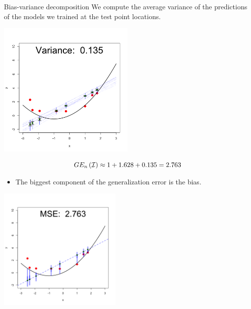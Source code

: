\documentclass[11pt,compress,t,notes=noshow, xcolor=table]{beamer}
\begin{document}
\begin{vbframe} {Bias-variance decomposition}
We compute the average variance of the predictions of the models we trained at the test point locations.
\vspace{-0.35cm}
\begin{center}
  \includegraphics[width = 0.5\textwidth]{figure/bias_variance_decomposition-linear_model_variance.png}
\end{center}
\vspace{-0.8cm}

$$GE_n\left(\mathcal{I}\right) \approx 1 + 1.628 + 0.135 = 2.763 $$


\begin{itemize}
  \item The biggest component of the generalization error is the bias.
\end{itemize}

\framebreak

\begin{center}
  \includegraphics[width = 0.45\textwidth]{figure/bias_variance_decomposition-linear_model_mse.png}
\end{center}

\begin{footnotesize}


\end{footnotesize}
\end{vbframe}
\end{document}
